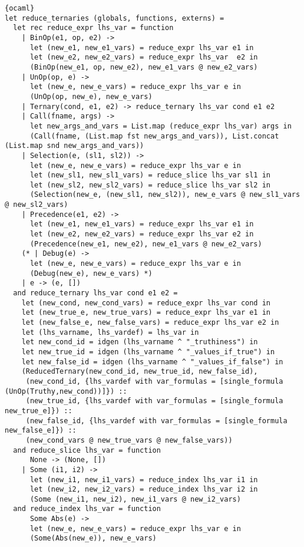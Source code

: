 \begin{lstlisting}{ocaml}
let reduce_ternaries (globals, functions, externs) =
  let rec reduce_expr lhs_var = function
    | BinOp(e1, op, e2) ->
      let (new_e1, new_e1_vars) = reduce_expr lhs_var e1 in
      let (new_e2, new_e2_vars) = reduce_expr lhs_var  e2 in
      (BinOp(new_e1, op, new_e2), new_e1_vars @ new_e2_vars)
    | UnOp(op, e) ->
      let (new_e, new_e_vars) = reduce_expr lhs_var e in
      (UnOp(op, new_e), new_e_vars)
    | Ternary(cond, e1, e2) -> reduce_ternary lhs_var cond e1 e2
    | Call(fname, args) ->
      let new_args_and_vars = List.map (reduce_expr lhs_var) args in
      (Call(fname, (List.map fst new_args_and_vars)), List.concat (List.map snd new_args_and_vars))
    | Selection(e, (sl1, sl2)) ->
      let (new_e, new_e_vars) = reduce_expr lhs_var e in
      let (new_sl1, new_sl1_vars) = reduce_slice lhs_var sl1 in
      let (new_sl2, new_sl2_vars) = reduce_slice lhs_var sl2 in
      (Selection(new_e, (new_sl1, new_sl2)), new_e_vars @ new_sl1_vars @ new_sl2_vars)
    | Precedence(e1, e2) ->
      let (new_e1, new_e1_vars) = reduce_expr lhs_var e1 in
      let (new_e2, new_e2_vars) = reduce_expr lhs_var e2 in
      (Precedence(new_e1, new_e2), new_e1_vars @ new_e2_vars)
    (* | Debug(e) ->
      let (new_e, new_e_vars) = reduce_expr lhs_var e in
      (Debug(new_e), new_e_vars) *)
    | e -> (e, [])
  and reduce_ternary lhs_var cond e1 e2 =
    let (new_cond, new_cond_vars) = reduce_expr lhs_var cond in
    let (new_true_e, new_true_vars) = reduce_expr lhs_var e1 in
    let (new_false_e, new_false_vars) = reduce_expr lhs_var e2 in
    let (lhs_varname, lhs_vardef) = lhs_var in
    let new_cond_id = idgen (lhs_varname ^ "_truthiness") in
    let new_true_id = idgen (lhs_varname ^ "_values_if_true") in
    let new_false_id = idgen (lhs_varname ^ "_values_if_false") in
    (ReducedTernary(new_cond_id, new_true_id, new_false_id),
     (new_cond_id, {lhs_vardef with var_formulas = [single_formula (UnOp(Truthy,new_cond))]}) ::
     (new_true_id, {lhs_vardef with var_formulas = [single_formula new_true_e]}) ::
     (new_false_id, {lhs_vardef with var_formulas = [single_formula new_false_e]}) ::
     (new_cond_vars @ new_true_vars @ new_false_vars))
  and reduce_slice lhs_var = function
      None -> (None, [])
    | Some (i1, i2) ->
      let (new_i1, new_i1_vars) = reduce_index lhs_var i1 in
      let (new_i2, new_i2_vars) = reduce_index lhs_var i2 in
      (Some (new_i1, new_i2), new_i1_vars @ new_i2_vars)
  and reduce_index lhs_var = function
      Some Abs(e) ->
      let (new_e, new_e_vars) = reduce_expr lhs_var e in
      (Some(Abs(new_e)), new_e_vars)

\end{lstlisting}

